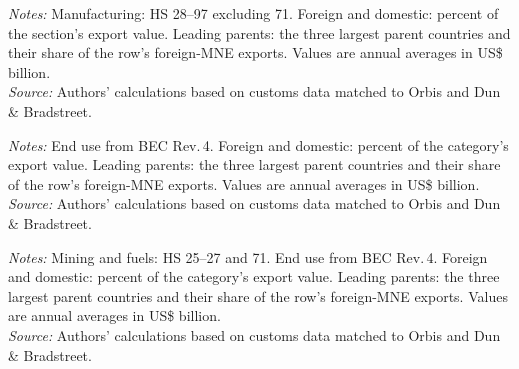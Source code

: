 \documentclass[11pt,a4paper]{article}
\begin{document}
\begin{table}[H]\centering\footnotesize%
  \caption{Manufacturing: Exports and Multinational Shares, by HS Section}%
  \label{tab:a_manuf_hs}%
  \par\vspace{3pt}%
  \begin{minipage}{0.95\textwidth}\footnotesize %
  \textit{Notes:} Manufacturing: HS 28--97 excluding 71. Foreign and domestic: percent of the section's export value. Leading parents: the three largest parent countries and their share of the row's foreign-MNE exports. Values are annual averages in US\$ billion.\\[3pt]%
  \textit{Source:} Authors' calculations based on customs data matched to Orbis and Dun \& Bradstreet.%
  \end{minipage}%
  \end{table}
\begin{table}[H]\centering\footnotesize%
  \caption{Manufacturing: Exports and Multinational Shares, by End Use}%
  \label{tab:a_manuf_bec}%
  \par\vspace{3pt}%
  \begin{minipage}{0.95\textwidth}\footnotesize %
  \textit{Notes:} End use from BEC Rev.\,4. Foreign and domestic: percent of the category's export value. Leading parents: the three largest parent countries and their share of the row's foreign-MNE exports. Values are annual averages in US\$ billion.\\[3pt]%
  \textit{Source:} Authors' calculations based on customs data matched to Orbis and Dun \& Bradstreet.%
  \end{minipage}%
  \end{table}
\begin{table}[H]\centering\footnotesize%
  \caption{Mining and Fuels: Exports and Multinational Shares, by End Use}%
  \label{tab:a_mining_bec}%
  \par\vspace{3pt}%
  \begin{minipage}{0.95\textwidth}\footnotesize %
  \textit{Notes:} Mining and fuels: HS 25--27 and 71. End use from BEC Rev.\,4. Foreign and domestic: percent of the category's export value. Leading parents: the three largest parent countries and their share of the row's foreign-MNE exports. Values are annual averages in US\$ billion.\\[3pt]%
  \textit{Source:} Authors' calculations based on customs data matched to Orbis and Dun \& Bradstreet.%
  \end{minipage}%
  \end{table}
\end{document}
